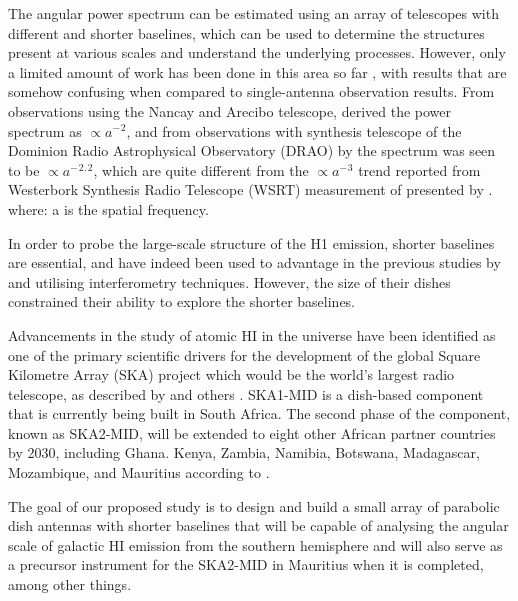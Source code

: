 {The angular power spectrum can be estimated using an array of telescopes with different and shorter baselines, which can be used to determine the structures present at various scales and understand the underlying processes. However, only a limited amount of work has been done in this area so far \cite{green1993power}, with results that are somehow confusing when compared to single-antenna observation results. From observations using the Nancay and Arecibo telescope, \cite{dickey2001southern} derived the power spectrum as \(\propto {a^-}{^2}\), and from observations with synthesis
telescope of the Dominion Radio Astrophysical Observatory (DRAO) by \cite{green1993power} the spectrum was seen to be \(\propto {a^-}{^2}{^.}{^2}\),
which are quite different from the \(\propto {a^-}{^3}\) trend reported from Westerbork Synthesis Radio Telescope (WSRT) measurement of  presented by \cite{crovisier1983spatial}. where: a is the spatial frequency.

In order to probe the large-scale structure of the H1 emission, shorter baselines are essential, and have indeed been  used to advantage in the previous studies by \cite{green1993power} and \cite{dickey2001southern} utilising interferometry techniques. However, the size of their dishes constrained their ability to explore the shorter baselines.




 Advancements in the study of atomic HI in the universe have been identified as one of the primary scientific drivers for the development of the global Square Kilometre Array (SKA) project \cite{taylor2012square, schilizzi2011project} which would be the world's largest radio telescope, as described by \cite{taylor2012square} and others  \cite{wang2020ska}. SKA1-MID is a dish-based component that is currently being built in South Africa. The second phase of the component, known as SKA2-MID, will be extended to eight other African partner countries by 2030, including Ghana. Kenya, Zambia, Namibia, Botswana, Madagascar, Mozambique, and Mauritius according to \cite{hoare2018uk}.


The goal of our proposed study is to design and build a small array of parabolic dish antennas with shorter baselines that will be capable of analysing the angular scale of galactic HI emission from the southern hemisphere and will also serve as a precursor instrument for the SKA2-MID in Mauritius when it is completed, among other things. 

}
